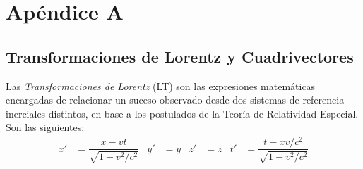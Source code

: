 \appendix
\chapter*{Apéndice A}\label{cap:A}
\setcounter{section}{0}
\renewcommand{\thesection}{A.\arabic{section}}

\section{Transformaciones de Lorentz y Cuadrivectores}\label{sec:Lorentz}
Las \textit{Transformaciones de Lorentz} (LT) son las expresiones matemáticas encargadas de relacionar un suceso observado desde dos sistemas de referencia inerciales distintos, en base a los postulados de la Teoría de Relatividad Especial. Son las siguientes:
\setlength{\abovedisplayskip}{6pt}
\setlength{\belowdisplayskip}{6pt}
\begin{align}
x' &= \dfrac{x-vt}{\sqrt{1-v^2/c^2}} & y' &=y & z' &=z & t' &=\dfrac{t-xv/c^2}{\sqrt{1-v^2/c^2}}\label{eq:TLorentz1}
\end{align}

